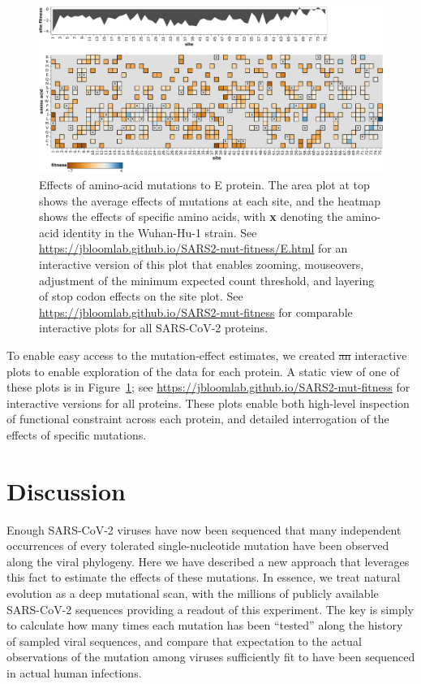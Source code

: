 \documentclass[9pt,twocolumn,twoside]{gsajnl_modified}
\providecommand{\DIFdel}[1]{{\protect\color{red}\sout{#1}}}                      %
\providecommand{\DIFdelbegin}{} %
\providecommand{\DIFdelend}{} %
\begin{document}
\begin{figure}
\includegraphics[width=\linewidth]{figs/E_heatmap.pdf}
\caption{
Effects of amino-acid mutations to E protein.
The area plot at top shows the average effects of mutations at each site, and the heatmap shows the effects of specific amino acids, with \textbf{x} denoting the amino-acid identity in the Wuhan-Hu-1 strain.
See \url{https://jbloomlab.github.io/SARS2-mut-fitness/E.html} for an interactive version of this plot that enables zooming, mouseovers, adjustment of the minimum expected count threshold, and layering of stop codon effects on the site plot.
See \url{https://jbloomlab.github.io/SARS2-mut-fitness} for comparable interactive plots for all SARS-CoV-2 proteins.
\label{fig:E_heatmap}
}
\end{figure}

To enable easy access to the mutation-effect estimates, we created \DIFdelbegin \DIFdel{an }\DIFdelend interactive plots to enable exploration of the data for each protein.
A static view of one of these plots is in Figure~\ref{fig:E_heatmap}; see \url{https://jbloomlab.github.io/SARS2-mut-fitness} for interactive versions for all proteins.
These plots enable both high-level inspection of functional constraint across each protein, and detailed interrogation of the effects of specific mutations.

\section{Discussion}

Enough SARS-CoV-2 viruses have now been sequenced that many independent occurrences of every tolerated single-nucleotide mutation have been observed along the viral phylogeny.
Here we have described a new approach that leverages this fact to estimate the effects of these mutations.
In essence, we treat natural evolution as a deep mutational scan, with the millions of publicly available SARS-CoV-2 sequences providing a readout of this experiment.
The key is simply to calculate how many times each mutation has been ``tested'' along the history of sampled viral sequences, and compare that expectation to the actual observations of the mutation among viruses sufficiently fit to have been sequenced in actual human infections.
\end{document}
